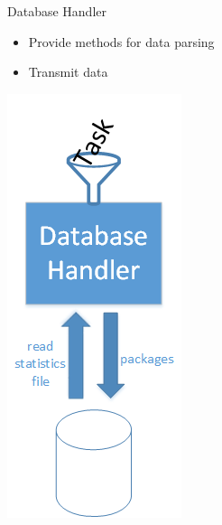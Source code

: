 	\begin{frame}{Database Handler}
	
	\begin{minipage}[]{.5\textwidth}%
	\begin{itemize}
		\item<2->{} {Provide methods for data parsing}
		\item<3->{} {Transmit data}
	\end{itemize}
	\end{minipage}	
	\begin{minipage}[]{.25\textwidth}%
	\vspace{-\ht\strutbox}\includegraphics[width=\textwidth]{images/zeichnunghandler.png}
	\end{minipage}%
	

\end{frame}
